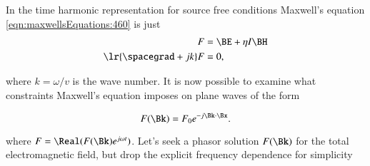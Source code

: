 %
%
In the time harmonic representation for source free conditions Maxwell's equation \cref{eqn:maxwellsEquations:460} is just
\begin{dmath}\label{eqn:maxwellsEquations:560}
\begin{aligned}
F &= \BE + \eta I \BH \\
\lr{ \spacegrad + j k } F &= 0,
\end{aligned}
\end{dmath}

where \( k = \omega/v \) is the wave number.
It is now possible to examine what constraints Maxwell's equation imposes on plane waves of the form

\begin{dmath}\label{eqn:maxwellsEquations:600}
F(\Bk) = F_0 e^{-j \Bk \cdot \Bx}.
\end{dmath}

where \( F = \Real( F(\Bk) e^{j \omega t} ) \).
Let's seek a phasor solution \( F(\Bk) \) for the total electromagnetic field, but drop the explicit frequency dependence for simplicity



